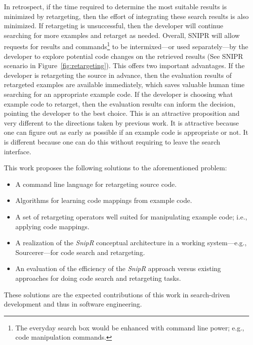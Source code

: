 In retrospect, if the time required to determine the most suitable results is minimized by retargeting, then the effort of integrating these search results is also minimized. If retargeting is unsuccessful, then the developer will continue searching for more examples and retarget as needed. Overall, \uppercase{SnipR} will allow requests for results and commands\footnote{The everyday search box would be enhanced with command line power; e.g., code manipulation commands.} to be intermixed---or used separately---by the developer to explore potential code changes on the retrieved results (See \uppercase{SnipR} scenario in Figure~\ref{fig:retargeting}). This offers two important advantages. If the developer is retargeting the source in advance, then the evaluation results of retargeted examples are available immediately, which saves valuable human time searching for an appropriate example code. If the developer is choosing what example code to retarget, then the evaluation results can inform the decision, pointing the developer to the best choice. This is an attractive proposition and very different to the directions taken by previous work. It is attractive because one can figure out as early as possible if an example code is appropriate or not. It is different because one can do this without requiring to leave the search interface.

This work proposes the following solutions to the aforementioned problem:

\begin{itemize}
\item A command line language for retargeting source code. 
\item Algorithms for learning code mappings from example code. 
\item A set of retargeting operators well suited for manipulating example code; i.e., applying code mappings.
\item A realization of the \emph{SnipR} conceptual architecture in a working system---e.g., Sourcerer\cite{Bajracharya:2006vn}---for code search and retargeting. 
\item An evaluation of the efficiency of the \emph{SnipR} approach versus existing approaches for doing code search and retargeting tasks. 
\end{itemize}

These solutions are the expected contributions of this work in search-driven development and thus in software engineering. 


